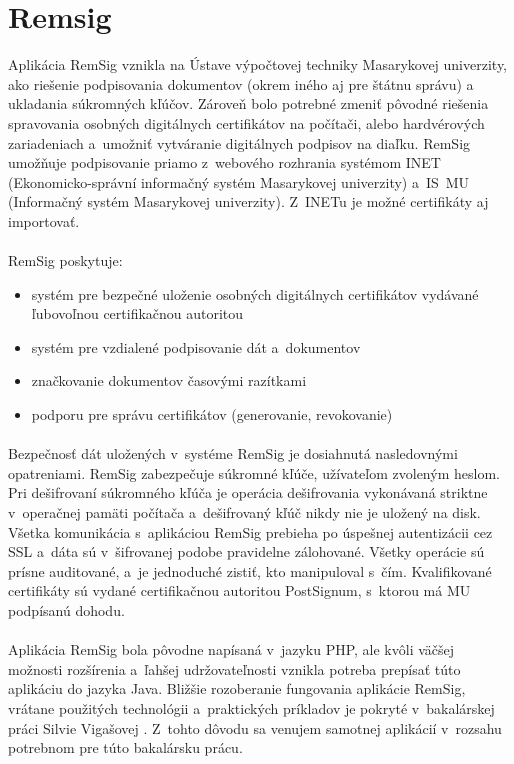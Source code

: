 \documentclass[
  digital, %
  table,   %
oneside,
  nolof,     %
  nolot,     %
]{fithesis3}
\begin{document}
\section{Remsig}
Aplikácia RemSig \cite{remsigMuni} vznikla na Ústave výpočtovej techniky Masarykovej univerzity, ako riešenie podpisovania dokumentov (okrem iného aj pre štátnu správu) a ukladania súkromných kľúčov. Zároveň bolo potrebné zmeniť pôvodné riešenia spravovania osobných digitálnych certifikátov na počítači, alebo hardvérových zariadeniach a~umožniť vytváranie digitálnych podpisov na diaľku. RemSig umožňuje podpisovanie priamo z~webového rozhrania systémom INET (Ekonomicko-správní informačný systém Masarykovej univerzity) a~IS~MU (Informačný systém Masarykovej univerzity). Z~INETu je možné certifikáty aj importovať.\paragraph{}
RemSig poskytuje:
\begin{itemize}
\item systém pre bezpečné uloženie osobných digitálnych certifikátov vydávané ľubovoľnou certifikačnou autoritou
\item systém pre vzdialené podpisovanie dát a~dokumentov
\item značkovanie dokumentov časovými razítkami 
\item podporu pre správu certifikátov (generovanie, revokovanie)

 \end{itemize}

\paragraph{}
Bezpečnosť dát uložených v~systéme RemSig je dosiahnutá nasledovnými opatreniami. RemSig zabezpečuje súkromné kľúče, užívateľom zvoleným heslom. Pri dešifrovaní súkromného kľúča je operácia dešifrovania vykonávaná striktne v~operačnej pamäti počítača a~dešifrovaný kľúč nikdy nie je uložený na disk. Všetka komunikácia s~aplikáciou RemSig prebieha po úspešnej autentizácii cez SSL a~dáta sú v~šifrovanej podobe pravidelne zálohované. Všetky operácie sú prísne auditované, a~je jednoduché zistiť, kto manipuloval s~čím. Kvalifikované certifikáty sú vydané certifikačnou autoritou PostSignum, s~ktorou má MU podpísanú dohodu.
\paragraph{}
Aplikácia RemSig bola pôvodne napísaná v~jazyku PHP, ale kvôli väčšej možnosti rozšírenia a~ľahšej udržovateľnosti \cite{javaVsPHP} vznikla potreba prepísať túto aplikáciu do jazyka Java.  Bližšie rozoberanie fungovania aplikácie RemSig, vrátane použitých technológii a~praktických príkladov je pokryté v~bakalárskej práci Silvie Vigašovej \cite{remsigSilvia}. Z~tohto dôvodu sa venujem samotnej aplikácií  v~rozsahu potrebnom pre túto bakalársku prácu. 
\end{document}
